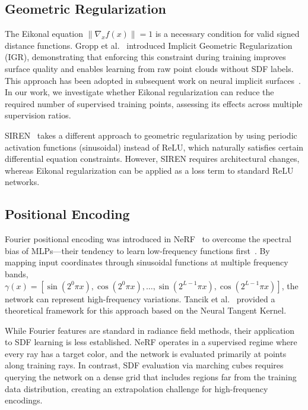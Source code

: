 \documentclass[conference]{IEEEtran}
\begin{document}
\subsection{Geometric Regularization}

The Eikonal equation $\|\nabla_x f(x)\| = 1$ is a necessary condition for valid signed distance functions. Gropp et al.~\cite{igr} introduced Implicit Geometric Regularization (IGR), demonstrating that enforcing this constraint during training improves surface quality and enables learning from raw point clouds without SDF labels. This approach has been adopted in subsequent work on neural implicit surfaces~\cite{volsdf, neus}. In our work, we investigate whether Eikonal regularization can reduce the required number of supervised training points, assessing its effects across multiple supervision ratios.

SIREN~\cite{siren} takes a different approach to geometric regularization by using periodic activation functions (sinusoidal) instead of ReLU, which naturally satisfies certain differential equation constraints. However, SIREN requires architectural changes, whereas Eikonal regularization can be applied as a loss term to standard ReLU networks.

\subsection{Positional Encoding}

Fourier positional encoding was introduced in NeRF~\cite{nerf} to overcome the spectral bias of MLPs---their tendency to learn low-frequency functions first~\cite{spectralbias}. By mapping input coordinates through sinusoidal functions at multiple frequency bands, $\gamma(x) = [\sin(2^0\pi x), \cos(2^0\pi x), \ldots, \sin(2^{L-1}\pi x), \cos(2^{L-1}\pi x)]$, the network can represent high-frequency variations. Tancik et al.~\cite{fourierfeatures} provided a theoretical framework for this approach based on the Neural Tangent Kernel.

While Fourier features are standard in radiance field methods, their application to SDF learning is less established. NeRF operates in a supervised regime where every ray has a target color, and the network is evaluated primarily at points along training rays. In contrast, SDF evaluation via marching cubes requires querying the network on a dense grid that includes regions far from the training data distribution, creating an extrapolation challenge for high-frequency encodings.
\end{document}
